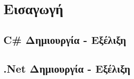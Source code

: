 \section{Εισαγωγή}

\subsection{C\# Δημιουργία - Εξέλιξη}
\label{C Sharp}


\subsection{.Net Δημιουργία - Εξέλιξη}
\label{.NEt}
